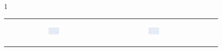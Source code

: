 \documentclass[12pt]{amsbook}
\begin{document}
    \begin{figure}[c]{1\textwidth}
        \begin{tabular}{llll}
        \begin{subfigure}[c]{0.31\textwidth}
            \centering
            \begin{subfigure}[p]{1\textwidth}
                \includegraphics[width=\linewidth]{../Code/Plots/examples/plot 1.png}
                
            \end{subfigure}

        \end{subfigure}
        &
        \centering
        \begin{subfigure}[c]{0.31\textwidth}
            \centering
            \begin{subfigure}[p]{1\textwidth}
                \includegraphics[width=\linewidth]{../Code/Plots/examples/plot 2.png}
                

\end{subfigure}
\end{subfigure}
\end{tabular}
\end{figure}
\end{document}

